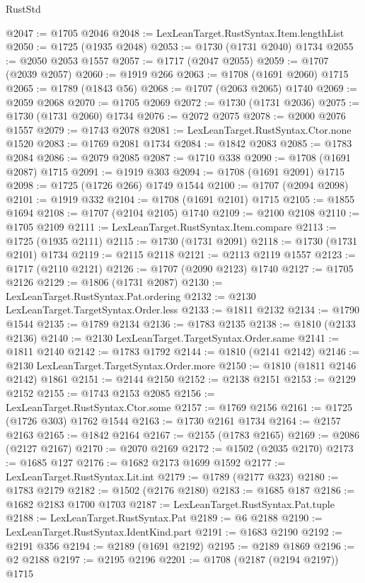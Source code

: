 \begin{lexlean}{RustStd}
\begin{coremodule}
@2047 := @1705 @2046
@2048 := LexLeanTarget.RustSyntax.Item.lengthList
@2050 := @1725 (@1935 @2048)
@2053 := @1730 (@1731 @2040) @1734
@2055 := @2050 @2053 @1557
@2057 := @1717 (@2047 @2055)
@2059 := @1707 (@2039 @2057)
@2060 := @1919 @266
@2063 := @1708 (@1691 @2060) @1715
@2065 := @1789 (@1843 @56)
@2068 := @1707 (@2063 @2065) @1740
@2069 := @2059 @2068
@2070 := @1705 @2069
@2072 := @1730 (@1731 @2036)
@2075 := @1730 (@1731 @2060) @1734
@2076 := @2072 @2075
@2078 := @2000 @2076 @1557
@2079 := @1743 @2078
@2081 := LexLeanTarget.RustSyntax.Ctor.none @1520
@2083 := @1769 @2081 @1734
@2084 := @1842 @2083
@2085 := @1783 @2084
@2086 := @2079 @2085
@2087 := @1710 @338
@2090 := @1708 (@1691 @2087) @1715
@2091 := @1919 @303
@2094 := @1708 (@1691 @2091) @1715
@2098 := @1725 (@1726 @266) @1749 @1544
@2100 := @1707 (@2094 @2098)
@2101 := @1919 @332
@2104 := @1708 (@1691 @2101) @1715
@2105 := @1855 @1694
@2108 := @1707 (@2104 @2105) @1740
@2109 := @2100 @2108
@2110 := @1705 @2109
@2111 := LexLeanTarget.RustSyntax.Item.compare
@2113 := @1725 (@1935 @2111)
@2115 := @1730 (@1731 @2091)
@2118 := @1730 (@1731 @2101) @1734
@2119 := @2115 @2118
@2121 := @2113 @2119 @1557
@2123 := @1717 (@2110 @2121)
@2126 := @1707 (@2090 @2123) @1740
@2127 := @1705 @2126
@2129 := @1806 (@1731 @2087)
@2130 := LexLeanTarget.RustSyntax.Pat.ordering
@2132 := @2130 LexLeanTarget.TargetSyntax.Order.less
@2133 := @1811 @2132
@2134 := @1790 @1544
@2135 := @1789 @2134
@2136 := @1783 @2135
@2138 := @1810 (@2133 @2136)
@2140 := @2130 LexLeanTarget.TargetSyntax.Order.same
@2141 := @1811 @2140
@2142 := @1783 @1792
@2144 := @1810 (@2141 @2142)
@2146 := @2130 LexLeanTarget.TargetSyntax.Order.more
@2150 := @1810 (@1811 @2146 @2142) @1861
@2151 := @2144 @2150
@2152 := @2138 @2151
@2153 := @2129 @2152
@2155 := @1743 @2153 @2085
@2156 := LexLeanTarget.RustSyntax.Ctor.some
@2157 := @1769 @2156
@2161 := @1725 (@1726 @303) @1762 @1544
@2163 := @1730 @2161 @1734
@2164 := @2157 @2163
@2165 := @1842 @2164
@2167 := @2155 (@1783 @2165)
@2169 := @2086 (@2127 @2167)
@2170 := @2070 @2169
@2172 := @1502 (@2035 @2170)
@2173 := @1685 @127
@2176 := @1682 @2173 @1699 @1592
@2177 := LexLeanTarget.RustSyntax.Lit.int
@2179 := @1789 (@2177 @323)
@2180 := @1783 @2179
@2182 := @1502 (@2176 @2180)
@2183 := @1685 @187
@2186 := @1682 @2183 @1700 @1703
@2187 := LexLeanTarget.RustSyntax.Pat.tuple
@2188 := LexLeanTarget.RustSyntax.Pat
@2189 := @6 @2188
@2190 := LexLeanTarget.RustSyntax.IdentKind.part
@2191 := @1683 @2190
@2192 := @2191 @356
@2194 := @2189 (@1691 @2192)
@2195 := @2189 @1869
@2196 := @2 @2188
@2197 := @2195 @2196
@2201 := @1708 (@2187 (@2194 @2197)) @1715

\end{coremodule}
\end{lexlean}
